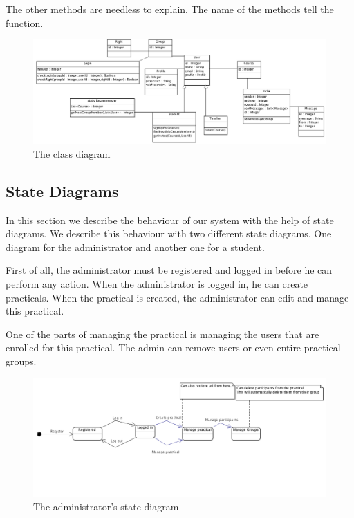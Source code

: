 The other methods are needless to explain.
The name of the methods tell the function.

\begin{figure}[H]
    \centering
    \captionsetup{justification=centering}
    \includegraphics[width=\textwidth, frame]{images/class_diagram}
    \caption{The class diagram}
    \label{class_diagram}
\end{figure}

\subsection{State Diagrams}
In this section we describe the behaviour of our system with the help of state diagrams.
We describe this behaviour with two different state diagrams.
One diagram for the administrator and another one for a student.

First of all, the administrator must be registered and logged in before he can perform any action.
When the administrator is logged in, he can create practicals.
When the practical is created, the administrator can edit and manage this practical.

One of the parts of managing the practical is managing the users that are enrolled for this practical.
The admin can remove users or even entire practical groups.

\begin{figure}[H]
    \centering
    \captionsetup{justification=centering}
    \includegraphics[width=\textwidth, frame]{images/state_diagram_admin}
    \caption{The administrator's state diagram}
    \label{state_diagram_admin}
\end{figure}

